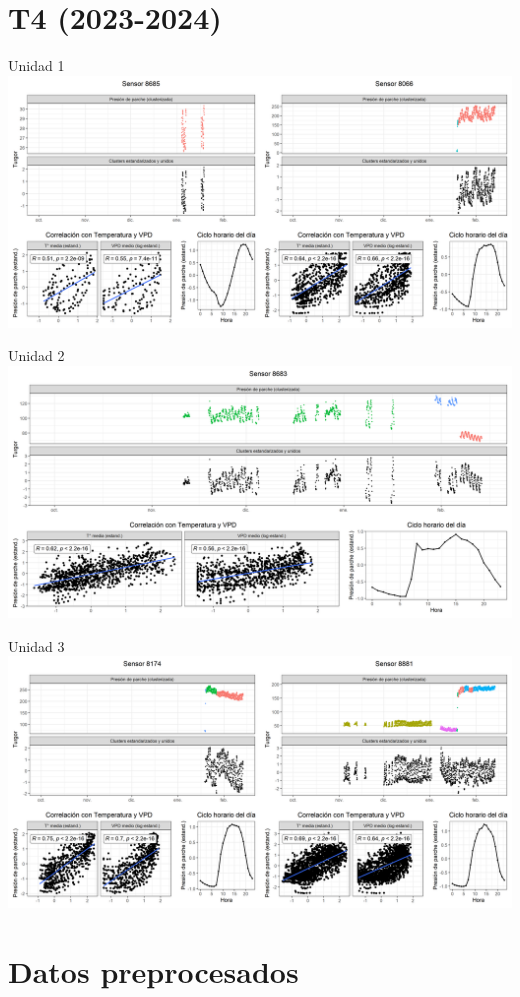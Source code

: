 \documentclass[
  letterpaper,
  DIV=11,
  numbers=noendperiod]{scrreprt}
\begin{document}
\chapter{T4 (2023-2024)}

Unidad 1
\includegraphics{figuras/03_turgor_union/2023_2024_Rio_Claro_T4_Unidad_1.png}

Unidad 2
\includegraphics{figuras/03_turgor_union/2023_2024_Rio_Claro_T4_Unidad_2.png}

Unidad 3
\includegraphics{figuras/03_turgor_union/2023_2024_Rio_Claro_T4_Unidad_3.png}

\chapter{Datos preprocesados}\label{datos-preprocesados}
\end{document}
